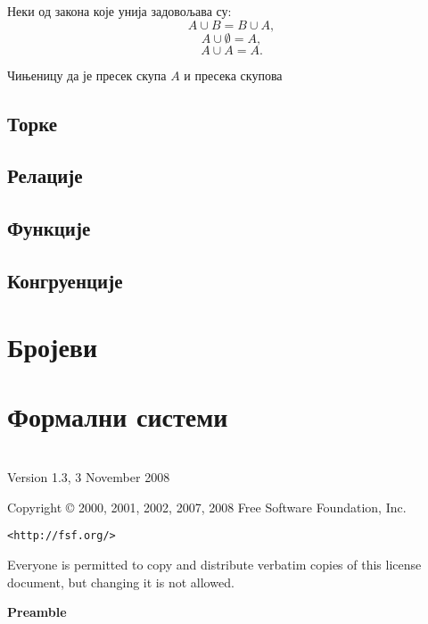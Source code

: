 \documentclass[a4paper]{book}
\begin{document}
Неки од закона које унија задовољава су:
$$
A\cup B=B\cup A,
$$
$$
A\cup\emptyset=A,
$$
$$
A\cup A=A.
$$

Чињеницу да је пресек скупа $A$ и пресека скупова 
\section{Торке}

\section{Релације}

\section{Функције}

\section{Конгруенције}

\chapter{Бројеви}
	
\chapter{Формални системи}

\chapter*{}

 \begin{center}

       Version 1.3, 3 November 2008


 Copyright \copyright{} 2000, 2001, 2002, 2007, 2008  Free Software Foundation, Inc.
 
 \bigskip
 
     \texttt{<http://fsf.org/>}
  
 \bigskip
 
 Everyone is permitted to copy and distribute verbatim copies
 of this license document, but changing it is not allowed.
\end{center}


\begin{center}
{\bf\large Preamble}
\end{center}
\end{document}
